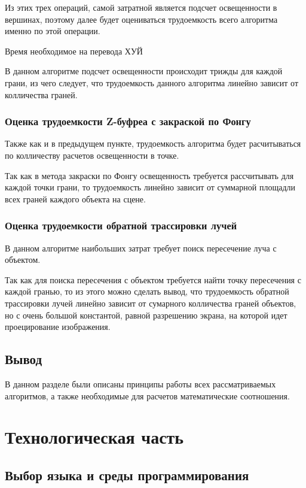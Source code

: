 \documentclass[12pt]{report}
\begin{document}
	Из этих трех операций, самой затратной является подсчет освещенности в вершинах, поэтому далее будет оцениваться трудоемкость всего алгоритма именно по этой операции.
	
	Время необходимое на перевода ХУЙ
	
	В данном алгоритме подсчет освещенности происходит трижды для каждой грани, из чего следует, что трудоемкость данного алгоритма линейно зависит от колличества граней.
	
	\subsection{Оценка трудоемкости Z-буфреа с закраской по Фонгу}
	
	Также как и в предыдущем пункте, трудоемкость алгоритма будет расчитываться по колличеству расчетов освещенности в точке.
	
	Так как в метода закраски по Фонгу освещенность требуется рассчитывать для каждой точки грани, то трудоемкость линейно зависит от суммарной площадли всех граней каждого объекта на сцене.
	
	\subsection{Оценка трудоемкости обратной трассировки лучей}

	В данном алгоритме наибольших затрат требует поиск пересечение луча с объектом.
	
	Так как для поиска пересечения с объектом требуется найти точку пересечения с каждой гранью, то из этого можно сделать вывод, что трудоемкость обратной трассировки лучей линейно зависит от сумарного колличества граней объектов, но с очень большой константой, равной разрешению экрана, на которой идет проецирование изображения.

	\section*{Вывод}

	В данном разделе были описаны принципы работы всех рассматриваемых алгоритмов, а также необходимые для расчетов математические соотношения.
	
	\chapter{Технологическая часть}
	
	\section{Выбор языка и среды программирования}
	
\end{document}

